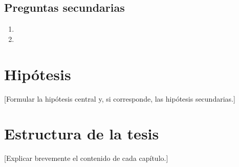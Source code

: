 \subsection{Preguntas secundarias}
\begin{enumerate}[align=left]
  \item [Pregunta secundaria 1]
  \item [Pregunta secundaria 2]
\end{enumerate}

\section{Hipótesis}
[Formular la hipótesis central y, si corresponde, las hipótesis secundarias.]

\section{Estructura de la tesis}
[Explicar brevemente el contenido de cada capítulo.]
